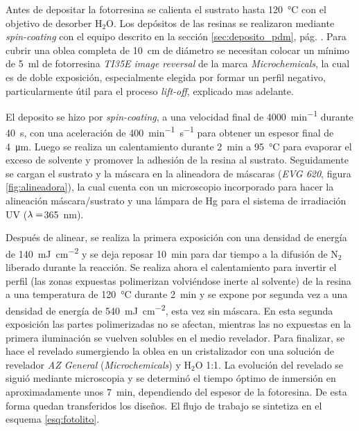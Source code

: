 		Antes de depositar la fotorresina se calienta el sustrato hasta \SI{120}{\celsius} con el objetivo de desorber H$_2$O. Los depósitos de las resinas se realizaron mediante \textit{spin-coating} con el equipo descrito en la sección \ref{sec:deposito_pdm}, pág. \pageref{sec:deposito_pdm}. Para cubrir una oblea completa de \SI{10}{\cm} de diámetro se necesitan colocar un mínimo de \SI{5}{\ml} de fotorresina \textit{TI35E image reversal} de la marca \textit{Microchemicals}, la cual es de doble exposición, especialmente elegida por formar un perfil negativo, particularmente útil para el proceso \textit{lift-off}, explicado mas adelante.\cite{MicrochemicalsTeam2009} 
	
		El deposito se hizo por \textit{spin-coating}, a una velocidad final de \SI{4000}{\minute^{-1}} durante \SI{40}{\second}, con una aceleración de \SI{400}{\minute^{-1}.\second^{-1}} para obtener un espesor final de \SI{4}{\um}. Luego se realiza un calentamiento durante \SI{2}{\minute} a \SI{95}{\celsius} para evaporar el exceso de solvente y promover la adhesión de la resina al sustrato. Seguidamente se cargan el sustrato y la máscara en la alineadora de máscaras (\textit{EVG 620}, figura \ref{fig:alineadora}), la cual cuenta con un microscopio incorporado para hacer la alineación máscara/sustrato y una lámpara de Hg para el sistema de irradiación UV ($\lambda\index{longitud de onda}=$\SI{365}{\nm}). 
				
		Después de alinear, se realiza la primera exposición con una densidad de energía de \SI{140}{mJ.\cm^{-2}} y se deja reposar \SI{10}{\minute} para dar tiempo a la difusión de N$_2$ liberado durante la reacción. Se realiza ahora el calentamiento para invertir el perfil (las zonas expuestas polimerizan volviéndose inerte al solvente) de la resina a una temperatura de \SI{120}{\celsius} durante \SI{2}{\minute}  y se expone por segunda vez a una densidad de energía de \SI{540}{mJ.cm^{-2}}, esta vez sin máscara. En esta segunda exposición las partes polimerizadas no se afectan, mientras las no expuestas en la primera iluminación se vuelven solubles en el medio revelador. Para finalizar, se hace el revelado sumergiendo la oblea en un cristalizador con una solución de revelador \textit{AZ General} (\textit{Microchemicals}) y H$_2$O 1:1. La evolución del revelado se siguió mediante microscopia y se determinó el tiempo óptimo de inmersión en aproximadamente unos \SI{7}{\minute}, dependiendo del espesor de la fotoresina. De esta forma quedan transferidos los diseños. El flujo de trabajo se sintetiza en el esquema \ref{esq:fotolito}.
				
